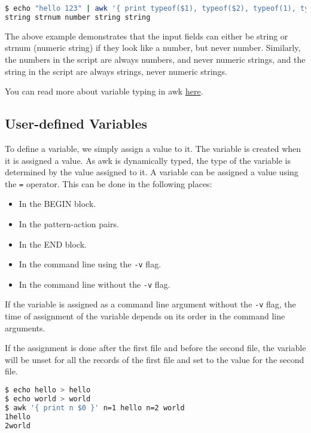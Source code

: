 \begin{lstlisting}[language=bash]
$ echo "hello 123" | awk '{ print typeof($1), typeof($2), typeof(1), typeof("1"), typeof("one") }'
string strnum number string string
\end{lstlisting}

The above example demonstrates that the input fields can either be string or strnum (numeric string) if they look like a number, but never number.
Similarly, the numbers in the script are always numbers, and never numeric strings, and the string in the script are always strings, never numeric strings.

You can read more about variable typing in awk
\href{https://www.gnu.org/software/gawk/manual/html\_node/Variable-Typing.html}{here}.

\subsection{User-defined Variables}

To define a variable, we simply assign a value to it. The variable is created when it is assigned a value.
As awk is dynamically typed, the type of the variable is determined by the value assigned to it.
A variable can be assigned a value using the \lstinline|=| operator.
This can be done in the following places:

\begin{itemize}
  \item In the BEGIN block.
  \item In the pattern-action pairs.
  \item In the END block.
  \item In the command line using the \lstinline|-v| flag.
  \item In the command line without the \lstinline|-v| flag.
\end{itemize}

If the variable is assigned as a command line argument without the \lstinline|-v| flag, the time of assignment of the variable depends on its order in the command line arguments.

If the assignment is done after the first file and before the second file, the variable will be unset for all the records of the first file and set to the value for the second file.

\begin{lstlisting}[language=bash]
$ echo hello > hello
$ echo world > world
$ awk '{ print n $0 }' n=1 hello n=2 world
1hello
2world
\end{lstlisting}

